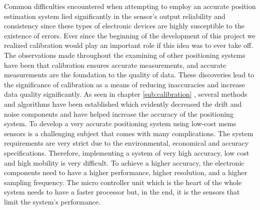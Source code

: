 Common difficulties encountered when attempting to employ an accurate position estimation system lied significantly in the sensor’s output reliability and consistency since these types of electronic devices are highly susceptible to the existence of errors. Ever since the beginning of the development of this project we realized calibration would play an important role if this idea was to ever take off. The observations made throughout the examining of other positioning systems have been that calibration ensures accurate measurements, and accurate measurements are the foundation to the quality of data. These discoveries lead to the significance of calibration as a means of reducing inaccuracies and increase data quality significantly. As seen in chapter \ref{sub:calibration} , several methods and algorithms have been established which evidently decreased the drift and noise components and have helped increase the accuracy of the positioning system. To develop a very accurate positioning system using low-cost \acrshort{mems} sensors is a challenging subject that comes with many complications. The system requirements are very strict due to the environmental, economical and accuracy specifications. Therefore, implementing a system of very high accuracy, low cost and high mobility is very difficult. To achieve a higher accuracy, the electronic components need to have a higher performance, higher resolution, and a higher sampling frequency. The micro controller unit which is the heart of the whole system needs to have a faster processor but, in the end, it is the sensors that limit the system's performance.
